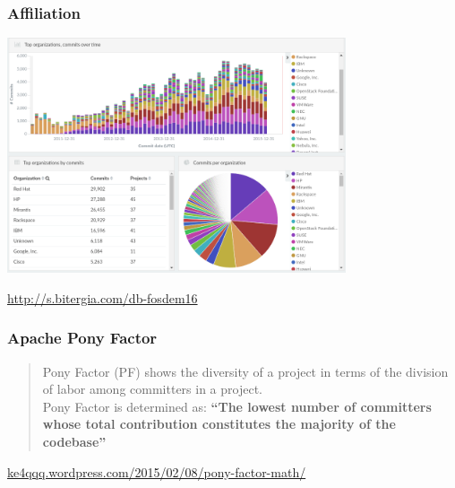 \documentclass[17pt,aspectratio=169,hyperref=pdfusetitle]{beamer}
\begin{document}

\begin{frame}
\frametitle{Affiliation}

\begin{center}
  \includegraphics[width=10cm]{figs/organizations-openstack}

\end{center}

\begin{flushright}
  \url{http://s.bitergia.com/db-fosdem16}
\end{flushright}


\end{frame}

\begin{frame}
\frametitle{Apache Pony Factor}


{\small
\begin{quote}
  Pony Factor (PF) shows the diversity of a project in terms of the division of labor among committers in a project. \\
  \vspace{.2cm}
  Pony Factor is determined as:
  {\bf ``The lowest number of committers whose total contribution constitutes the majority of the codebase''} \\
\end{quote}
}
\footnotesize{
\begin{flushright}
  \href{https://ke4qqq.wordpress.com/2015/02/08/pony-factor-math/}{ke4qqq.wordpress.com/2015/02/08/pony-factor-math/}
\end{flushright}
}
\end{frame}
\end{document}
